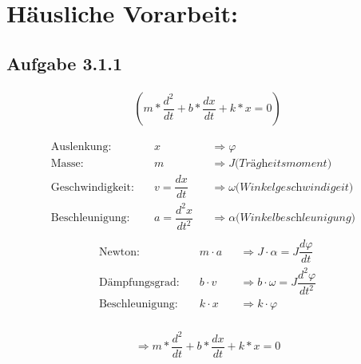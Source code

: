 \documentclass[a4paper]{scrartcl}
\def\header#1#2{
  \begin{center}
    {\Large #1}\\
    {#2}
  \end{center}
}
\begin{document}
\header{\HEADDING}{\SUBHEADDING}

\section*{Häusliche Vorarbeit:}
\subsection*{Aufgabe 3.1.1}

\begin{align}
(m*\dfrac{d^2}{dt} + b*\dfrac{dx}{dt} + k*x = 0)
\end{align}

\begin{align*}
 \text{Auslenkung:}& \quad x 
 	&&\Rightarrow \varphi \\
 \text{Masse:}& \quad m 
 	&&\Rightarrow J \textit{(Trägheitsmoment)} &\\
 \text{Geschwindigkeit:}& \quad v=\dfrac{dx}{dt} 
 	&&\Rightarrow \omega \textit{(Winkelgeschwindigeit)}&\\
 \text{Beschleunigung:}& \quad a=\dfrac{d^2x}{dt^2} 
 	&&\Rightarrow \alpha \textit{(Winkelbeschleunigung)}&\\
\end{align*}
\begin{align*}
 \text{Newton:}& \quad m \cdot a 
 	&&\Rightarrow J \cdot \alpha = J \dfrac{d\varphi}{dt} \\
 \text{Dämpfungsgrad:}& \quad b \cdot v 
 	&&\Rightarrow b \cdot \omega = J \dfrac{d^2\varphi}{dt^2} \\
 \text{Beschleunigung:}& \quad k \cdot x 
 	&&\Rightarrow k \cdot \varphi\\
\end{align*}

\begin{align}
\Rightarrow m*\dfrac{d^2}{dt} + b*\dfrac{dx}{dt} + k*x = 0
\end{align}




	
\end{document}
